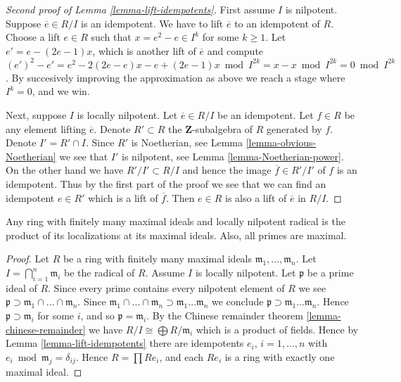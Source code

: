 \begin{proof}[Second proof of Lemma \ref{lemma-lift-idempotents}]
First assume $I$ is nilpotent.
Suppose $\overline{e} \in R/I$ is an idempotent.
We have to lift $\overline{e}$ to an idempotent of $R$.
Choose a lift $e \in R$ such that $x = e^2 - e \in I^k$ for some
$k\geq 1$. Let $e' = e - (2e-1)x$, which is another lift of $\overline{e}$
and compute $(e')^2 - e' =
e^2 - 2(2e-e)x - e + (2e-1)x \bmod I^{2k} =
x - x \bmod I^{2k} = 0 \bmod I^{2k}$.
By succesively improving the approximation as above we reach a
stage where $I^k = 0$, and we win.

\medskip\noindent
Next, suppose $I$ is locally nilpotent.
Let $\overline{e} \in R/I$ be an idempotent.
Let $f \in R$ be any element lifting $\overline{e}$.
Denote $R' \subset R$ the $\mathbf{Z}$-subalgebra of $R$ generated
by $f$. Denote $I' = R' \cap I$. Since $R'$ is Noetherian,
see Lemma \ref{lemma-obvious-Noetherian} we see that $I'$ is
nilpotent, see Lemma \ref{lemma-Noetherian-power}. On the other
hand we have $R' / I' \subset R/I$ and hence the image
$\overline{f} \in R'/I'$ of $f$ is an idempotent.
Thus by the first part of the proof we see that
we can find an idempotent $e \in R'$ which
is a lift of $\overline{f}$.
Then $e \in R$ is also a lift of $\overline{e}$ in $R/I$.
\end{proof}

\begin{lemma}
\label{lemma-product-local}
Any ring with finitely many maximal ideals and
locally nilpotent radical is the product of its localizations
at its maximal ideals. Also, all primes are maximal.
\end{lemma}

\begin{proof}
Let $R$ be a ring with finitely many maximal ideals
$\mathfrak m_1, \ldots, \mathfrak m_n$.
Let $I = \bigcap_{i = 1}^n \mathfrak m_i$
be the radical of $R$. Assume $I$ is locally nilpotent.
Let $\mathfrak p$ be a prime ideal of $R$.
Since every prime contains every nilpotent
element of $R$ we see
$ \mathfrak p \supset \mathfrak m_1 \cap \ldots \cap \mathfrak m_n$.
Since $\mathfrak m_1 \cap \ldots \cap \mathfrak m_n \supset
\mathfrak m_1 \ldots \mathfrak m_n$
we conclude $\mathfrak p \supset \mathfrak m_1 \ldots \mathfrak m_n$.
Hence $\mathfrak p \supset \mathfrak m_i$ for some $i$, and so
$\mathfrak p = \mathfrak m_i$. By the Chinese remainder
theorem \ref{lemma-chinese-remainder}
we have $R/I \cong \bigoplus R/\mathfrak m_i$
which is a product of fields.
Hence by Lemma \ref{lemma-lift-idempotents}
there are idempotents $e_i$, $i = 1, \ldots, n$
with $e_i \bmod \mathfrak m_j = \delta_{ij}$.
Hence $R = \prod Re_i$, and each $Re_i$ is a
ring with exactly one maximal ideal.
\end{proof}

